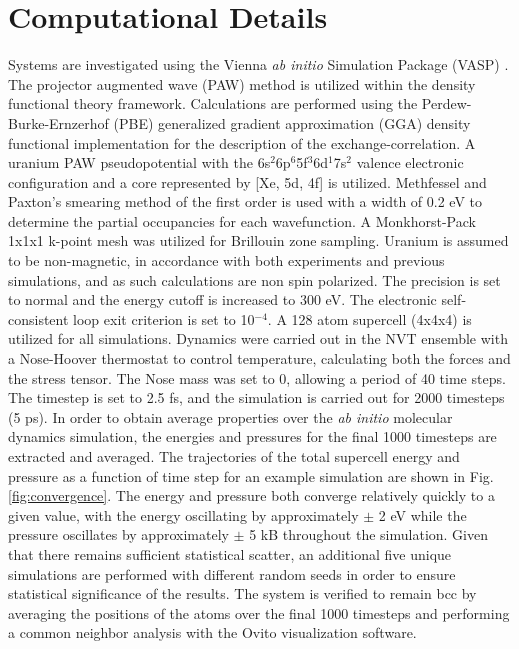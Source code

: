 \documentclass[review]{elsarticle}
\begin{document}
\section{Computational Details}
Systems are investigated using the Vienna \textit{ab initio} Simulation Package (VASP) \cite{vasp1, vasp2, vasp3, vasp4}. The projector augmented wave (PAW) method \cite{paw1, paw2} is utilized within the density functional theory \cite{dft1, dft2} framework. Calculations are performed using the Perdew-Burke-Ernzerhof (PBE) \cite{pbe1, pbe2} generalized gradient approximation (GGA) density functional implementation for the description of the exchange-correlation. A uranium PAW pseudopotential with the 6s$^{2}$6p$^{6}$5f$^{3}$6d$^{1}$7s$^{2}$ valence electronic configuration and a core represented by [Xe, 5d, 4f] is utilized. Methfessel and Paxton's smearing method \cite{methfessel} of the first order is used with a width of 0.2 eV to determine the partial occupancies for each wavefunction. A Monkhorst-Pack \cite{monkhorst} 1x1x1 k-point mesh was utilized for Brillouin zone sampling. Uranium is assumed to be non-magnetic, in accordance with both experiments and previous simulations, and as such calculations are non spin polarized. The precision is set to normal and the energy cutoff is increased to 300 eV. The electronic self-consistent loop exit criterion is set to 10$^{-4}$.  A 128 atom supercell (4x4x4) is utilized for all simulations. Dynamics were carried out in the NVT ensemble with a Nose-Hoover thermostat to control temperature, calculating both the forces and the stress tensor. The Nose mass was set to 0, allowing a period of 40 time steps. The timestep is set to 2.5 fs, and the simulation is carried out for 2000 timesteps (5 ps). In order to obtain average properties over the \textit{ab initio} molecular dynamics simulation, the energies and pressures for the final 1000 timesteps are extracted and averaged. The trajectories of the total supercell energy and pressure as a function of time step for an example simulation are shown in Fig. \ref{fig:convergence}. The energy and pressure both converge relatively quickly to a given value, with the energy oscillating by approximately $\pm$ 2 eV while the pressure oscillates by approximately $\pm$ 5 kB throughout the simulation. Given that there remains sufficient statistical scatter, an additional five unique simulations are performed with different random seeds in order to ensure statistical significance of the results. The system is verified to remain bcc by averaging the positions of the atoms over the final 1000 timesteps and performing a common neighbor analysis with the Ovito \cite{ovito} visualization software. 
\end{document}
